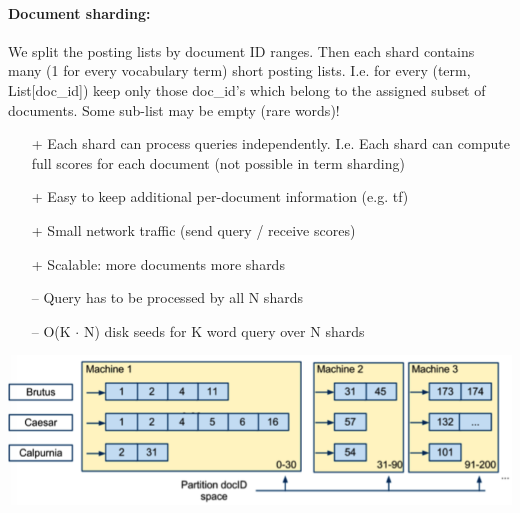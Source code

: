 \documentclass[a4paper,11pt]{article}
\begin{document}
\begin{multicols}{2}
\paragraph{Document sharding:} We split the posting lists by document ID ranges. Then each shard contains many (1 for every vocabulary term) short posting lists. I.e. for every (term, List[doc\_id]) keep only those doc\_id's which belong to the assigned subset of documents. Some sub-list may be empty (rare words)!
\begin{itemize}
  \item[+] Each shard can process queries independently. I.e. Each shard can compute full scores for each document (not possible in term sharding)
  \item[+] Easy to keep additional per-document information (e.g. tf)
  \item[+] Small network traffic (send query / receive scores) 
  \item[+] Scalable: more documents more shards
  \item[--] Query has to be processed by all N shards
  \item[--] O(K $\cdot$ N) disk seeds for K word query over N shards
\end{itemize}
\begin{center}
  \includegraphics[width=0.9\columnwidth]{document-shard.png}
\end{center}


\end{multicols}
\end{document}
